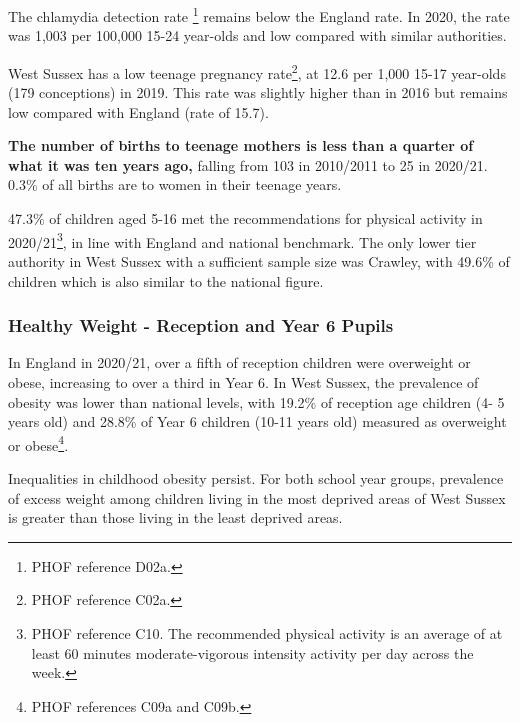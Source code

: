 The chlamydia detection rate \footnote{PHOF reference D02a.} remains below the England rate. In 2020, the rate was 1,003 per 100,000 15-24 year-olds and low compared with similar authorities.

West Sussex has a low teenage pregnancy rate\footnote{PHOF reference C02a.}, at 12.6 per 1,000 15-17 year-olds (179 conceptions) in 2019. This rate was slightly higher than in 2016 but remains low compared with England (rate of 15.7).


{\bfseries The number of births to teenage mothers is less than a quarter of what it was ten years ago,} falling from 103 in 2010/2011 to 25 in 2020/21. 0.3\% of all births are to women in their teenage years. 

47.3\% of children aged 5-16 met the recommendations for physical activity in 2020/21\footnote{PHOF reference C10. The recommended physical activity is an average of at least 60 minutes moderate-vigorous intensity activity per day across the week.}, in line with England and national benchmark. The only lower tier authority in West Sussex with a sufficient sample size was Crawley, with 49.6\% of children which is also similar to the national figure.

\subsubsection{Healthy Weight - Reception and Year 6 Pupils}
In England in 2020/21, over a fifth of reception children were overweight or obese, increasing to over a third in Year 6. In West Sussex, the prevalence of obesity was lower than national levels, with 19.2\% of reception age children (4- 5 years old) and 28.8\% of Year 6 children (10-11 years old) measured as overweight or obese\footnote{PHOF references C09a and C09b.}.


Inequalities in childhood obesity persist. For both school year groups, prevalence of excess weight among children living in the most deprived areas of West Sussex is greater than those living in the least deprived areas.

